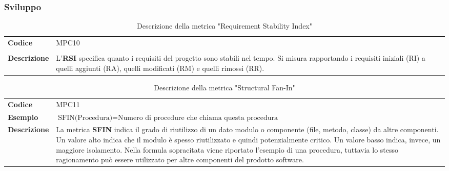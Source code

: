 \documentclass[a4paper,12pt]{article}
\begin{document}
        \subsubsection{Sviluppo}{
            {\renewcommand{\arraystretch}{1.4}
            \begin{table}[H]
            \centering
            \begin{tabularx}{\textwidth}{|l|X|}
                \hline
                \rowcolor{gold}
                \multicolumn{2}{|c|}{\textbf{Requirement Stability Index (RSI)}}\\
                \hline
                \textbf{Codice} & MPC10\\
                \hline
                \raisebox{0.6\height}{\textbf{Formula}} &  \rule{0pt}{5ex}\raisebox{0.3\height}{\( \displaystyle \text{RSI} = \left[1-\left(\frac{\text{RA}+\text{RM}+\text{RR}}{\text{RI}}\right)\right]*100 \)}\\
                \hline
                \textbf{Descrizione} & L'\textbf{RSI} specifica quanto i requisiti del progetto sono stabili nel tempo. Si misura rapportando i requisiti iniziali (RI) a quelli aggiunti (RA), quelli modificati (RM) e quelli rimossi (RR).\\
                \hline
            \end{tabularx}      
            \caption{Descrizione della metrica "Requirement Stability Index"}
            \end{table}
            }

            {\renewcommand{\arraystretch}{1.4}
                \begin{table}[H]
                \centering
                \begin{tabularx}{\textwidth}{|l|X|}
                    \hline
                    \rowcolor{gold}
                    \multicolumn{2}{|c|}{\textbf{Structural Fan-In (SFIN)}}\\
                    \hline
                    \textbf{Codice} & MPC11 \\
                    \hline
                    \textbf{Esempio} & \( \displaystyle \text{SFIN(Procedura)} = \text{Numero di procedure che chiama questa procedura} \)\\
                    \hline
                    \textbf{Descrizione} & La metrica \textbf{SFIN} indica il grado di riutilizzo di un dato modulo o componente (file, metodo, classe) da altre componenti. Un valore alto indica che il modulo è spesso riutilizzato e quindi potenzialmente critico. Un valore basso indica, invece, un maggiore isolamento. Nella formula sopracitata viene riportato l'esempio di una procedura, tuttavia lo stesso ragionamento può essere utilizzato per altre componenti del prodotto software.\\
                    \hline
                \end{tabularx}      
                \caption{Descrizione della metrica "Structural Fan-In"}
                \end{table}
            }

}
\end{document}
